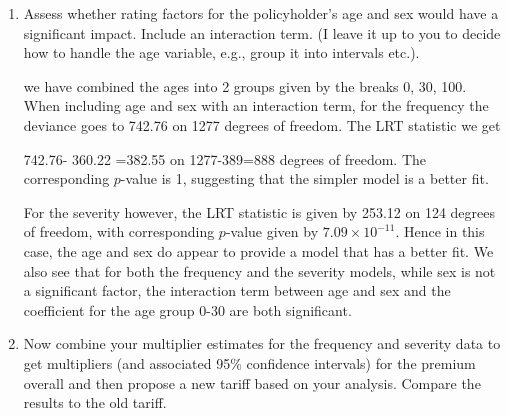\documentclass[11pt]{article}
\begin{document}
\begin{enumerate}
\item Assess whether rating factors for the policyholder's age and sex would have a significant impact. Include an interaction term. (I leave it up to you to decide how to handle the age variable, e.g., group it into intervals etc.).

 we have combined the ages into 2 groups given by the breaks 0, 30, 100. When including age and sex with an interaction term, for the frequency the deviance goes to 742.76  on 1277 degrees of freedom. The LRT statistic we get

742.76- 360.22 =382.55 on 1277-389=888 degrees of freedom. The corresponding $p$-value is 1, suggesting that the simpler model is a better fit.

For the severity however, the LRT statistic is given by 253.12 on 124 degrees of freedom, with corresponding $p$-value given by $7.09 \times 10^{-11}$. Hence in this case, the age and sex do appear to provide a model that has a better fit. We also see that for  both the frequency and the severity models, while sex is not a significant factor, the interaction term between age and sex and the coefficient for the age group 0-30 are both significant.






\item Now combine your multiplier estimates for the frequency and severity data to get multipliers (and associated 95\% confidence intervals) for the premium overall and then propose a new tariff based on your analysis. Compare the results to the old tariff.


\end{enumerate}
\end{document}
